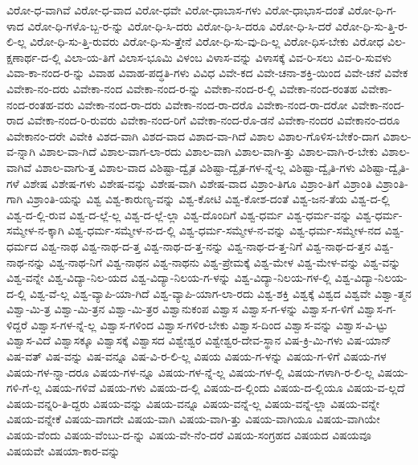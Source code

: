 {ವಿರೋ-ಧ-ವಾಗಿವೆ
ವಿರೋ-ಧ-ವಾದ
ವಿರೋ-ಧವೇ
ವಿರೋ-ಧಾಬಾಸ-ಗಳು
ವಿರೋ-ಧಾಭಾಸ-ದಂತೆ
ವಿರೋ-ಧಿ-ಗ-ಳಾದ
ವಿರೋ-ಧಿ-ಗಳೊ-ಬ್ಬ-ರ-ನ್ನು
ವಿರೋ-ಧಿ-ಸಿ-ದರು
ವಿರೋ-ಧಿ-ಸಿ-ದರೂ
ವಿರೋ-ಧಿ-ಸಿ-ದರೆ
ವಿರೋ-ಧಿ-ಸು-ತ್ತಿ-ರ-ಲಿ-ಲ್ಲ
ವಿರೋ-ಧಿ-ಸು-ತ್ತಿ-ರುವರು
ವಿರೋ-ಧಿ-ಸು-ತ್ತೇನೆ
ವಿರೋ-ಧಿ-ಸು-ವು-ದಿ-ಲ್ಲ
ವಿರೋ-ಧಿಸ-ಬೇಕು
ವಿರೋಧ
ವಿಲ-ಕ್ಷಣಾರ್ಥ-ದ-ಲ್ಲಿ
ವಿಲಾ-ಯ-ತಿಗೆ
ವಿಲಾಸ-ಭೂಮಿ
ವಿಳಂಬ
ವಿಳಾಸ-ವನ್ನು
ವಿಳಾಸಕ್ಕೆ
ವಿವ-ರಿ-ಸಲು
ವಿವ-ರಿ-ಸುವಳು
ವಿವಾ-ಕಾ-ನಂದ-ರ-ನ್ನು
ವಿವಾಹ
ವಿವಾಹ-ಪದ್ಧತಿ-ಗಳು
ವಿವಿಧ
ವಿವೇ-ಕದ
ವಿವೇ-ಚನಾ-ಶಕ್ತಿ-ಯಿಂದ
ವಿವೇ-ಚನೆ
ವಿವೇಕ
ವಿವೇಕಾ-ನಂ-ದರು
ವಿವೇಕಾ-ನಂದ
ವಿವೇಕಾ-ನಂದ-ರ-ನ್ನು
ವಿವೇಕಾ-ನಂದ-ರ-ಲ್ಲಿ
ವಿವೇಕಾ-ನಂದ-ರಂತಹ
ವಿವೇಕಾ-ನಂದ-ರಂತಹ-ವರು
ವಿವೇಕಾ-ನಂದ-ರಾ-ದರು
ವಿವೇಕಾ-ನಂದ-ರಾ-ದರೊ
ವಿವೇಕಾ-ನಂದ-ರಾ-ದರೋ
ವಿವೇಕಾ-ನಂದ-ರಾದ
ವಿವೇಕಾ-ನಂದ-ರಿ-ರುವರು
ವಿವೇಕಾ-ನಂದ-ರಿಗೆ
ವಿವೇಕಾ-ನಂದ-ರೊ-ಡನೆ
ವಿವೇಕಾ-ನಂದರ
ವಿವೇಕಾನಂ-ದರೂ
ವಿವೇಕಾನಂ-ದರೇ
ವಿವೇಕಿ
ವಿಶದ-ವಾಗಿ
ವಿಶದ-ವಾದ
ವಿಶಾದ-ವಾ-ಗಿದೆ
ವಿಶಾಲ
ವಿಶಾಲ-ಗೊಳಿಸ-ಬೇಕೆಂ-ದಾಗ
ವಿಶಾಲ-ವ-ನ್ನಾಗಿ
ವಿಶಾಲ-ವಾ-ಗಿದೆ
ವಿಶಾಲ-ವಾಗ-ಲಾ-ರದು
ವಿಶಾಲ-ವಾಗಿ
ವಿಶಾಲ-ವಾಗಿ-ತ್ತು
ವಿಶಾಲ-ವಾಗಿ-ರ-ಬೇಕು
ವಿಶಾಲ-ವಾಗಿವೆ
ವಿಶಾಲ-ವಾಗು-ತ್ತ
ವಿಶಾಲ-ವಾದ
ವಿಶಿಷ್ಟಾ-ದ್ವೈತ
ವಿಶಿಷ್ಟಾ-ದ್ವೈತ-ಗಳ-ನ್ನೆ-ಲ್ಲ
ವಿಶಿಷ್ಟಾ-ದ್ವೈತಿ-ಗಳು
ವಿಶಿಷ್ಟಾ-ದ್ವೈತಿ-ಗಳೆ
ವಿಶೇಷ
ವಿಶೇಷ-ಗಳು
ವಿಶೇಷ-ವನ್ನು
ವಿಶೇಷ-ವಾಗಿ
ವಿಶೇಷ-ವಾದ
ವಿಶ್ರಾಂ-ತಿಗೂ
ವಿಶ್ರಾಂ-ತಿಗೆ
ವಿಶ್ರಾಂತಿ
ವಿಶ್ರಾಂತಿ-ಗಾಗಿ
ವಿಶ್ರಾಂತಿ-ಯನ್ನು
ವಿಶ್ವ
ವಿಶ್ವ-ಕಾರುಣ್ಯ-ವನ್ನು
ವಿಶ್ವ-ಕೋಟಿ
ವಿಶ್ವ-ಕೋಶ-ದಂತೆ
ವಿಶ್ವ-ಜನ-ತೆಯ
ವಿಶ್ವ-ದ-ಲ್ಲಿ
ವಿಶ್ವ-ದ-ಲ್ಲಿ-ರುವ
ವಿಶ್ವ-ದ-ಲ್ಲೆ-ಲ್ಲ
ವಿಶ್ವ-ದ-ಲ್ಲೆ-ಲ್ಲಾ
ವಿಶ್ವ-ದೊಂದಿಗೆ
ವಿಶ್ವ-ಧರ್ಮ
ವಿಶ್ವ-ಧರ್ಮ-ವನ್ನು
ವಿಶ್ವ-ಧರ್ಮ-ಸಮ್ಮೇಳ-ನ-ಕ್ಕಾಗಿ
ವಿಶ್ವ-ಧರ್ಮ-ಸಮ್ಮೇಳ-ನ-ದ-ಲ್ಲಿ
ವಿಶ್ವ-ಧರ್ಮ-ಸಮ್ಮೇಳ-ನ-ವನ್ನು
ವಿಶ್ವ-ಧರ್ಮ-ಸಮ್ಮೇಳ-ನದ
ವಿಶ್ವ-ಧರ್ಮದ
ವಿಶ್ವ-ನಾಥ
ವಿಶ್ವ-ನಾಥ-ದ-ತ್ತ
ವಿಶ್ವ-ನಾಥ-ದ-ತ್ತ-ನನ್ನು
ವಿಶ್ವ-ನಾಥ-ದ-ತ್ತ-ನಿಗೆ
ವಿಶ್ವ-ನಾಥ-ದ-ತ್ತನ
ವಿಶ್ವ-ನಾಥ-ನನ್ನು
ವಿಶ್ವ-ನಾಥ-ನಿಗೆ
ವಿಶ್ವ-ನಾಥನ
ವಿಶ್ವ-ನಾಥನು
ವಿಶ್ವ-ಪ್ರೇಮಕ್ಕೆ
ವಿಶ್ವ-ಮೇಳ
ವಿಶ್ವ-ಮೇಳ-ವನ್ನು
ವಿಶ್ವ-ವನ್ನು
ವಿಶ್ವ-ವನ್ನೇ
ವಿಶ್ವ-ವಿದ್ಯಾ-ನಿಲ-ಯದ
ವಿಶ್ವ-ವಿದ್ಯಾ-ನಿಲಯ-ಗ-ಳನ್ನು
ವಿಶ್ವ-ವಿದ್ಯಾ-ನಿಲಯ-ಗಳ-ಲ್ಲಿ
ವಿಶ್ವ-ವಿದ್ಯಾ-ನಿಲಯ-ದ-ಲ್ಲಿ
ವಿಶ್ವ-ವೆ-ಲ್ಲ
ವಿಶ್ವ-ವ್ಯಾಪಿ-ಯಾ-ಗಿದೆ
ವಿಶ್ವ-ವ್ಯಾಪಿ-ಯಾಗ-ಲಾ-ರದು
ವಿಶ್ವ-ಶಕ್ತಿ
ವಿಶ್ವಕ್ಕೆ
ವಿಶ್ವದ
ವಿಶ್ವವೇ
ವಿಶ್ವಾ-ತ್ಮನ
ವಿಶ್ವಾ-ಮಿ-ತ್ರ
ವಿಶ್ವಾ-ಮಿ-ತ್ರನ
ವಿಶ್ವಾ-ಮಿ-ತ್ರರ
ವಿಶ್ವಾನುಕಂಪ
ವಿಶ್ವಾಸ
ವಿಶ್ವಾಸ-ಗ-ಳನ್ನು
ವಿಶ್ವಾಸ-ಗ-ಳಿಗೆ
ವಿಶ್ವಾಸ-ಗ-ಳಿದ್ದರೆ
ವಿಶ್ವಾಸ-ಗಳ-ನ್ನೆ-ಲ್ಲ
ವಿಶ್ವಾಸ-ಗಳಿಂದ
ವಿಶ್ವಾಸ-ಗಳಿರ-ಬೇಕು
ವಿಶ್ವಾಸ-ದಿಂದ
ವಿಶ್ವಾಸ-ವನ್ನು
ವಿಶ್ವಾಸ-ವಿ-ಟ್ಟು
ವಿಶ್ವಾಸ-ವಿದೆ
ವಿಶ್ವಾಸಕ್ಕೂ
ವಿಶ್ವಾಸಕ್ಕೆ
ವಿಶ್ವಾಸದ
ವಿಶ್ವೇಶ್ವರ
ವಿಶ್ವೇಶ್ವರ-ದೇವ-ಸ್ಥಾನ
ವಿಷ-ಕ್ರಿ-ಮಿ-ಗಳು
ವಿಷ-ಯಾನ್
ವಿಷ-ವತ್
ವಿಷ-ವನ್ನು
ವಿಷ-ವನ್ನೂ
ವಿಷ-ವಿ-ರ-ಲಿ-ಲ್ಲ
ವಿಷಯ
ವಿಷಯ-ಗ-ಳನ್ನು
ವಿಷಯ-ಗ-ಳಿಗೆ
ವಿಷಯ-ಗಳ
ವಿಷಯ-ಗಳ-ನ್ನಾ-ದರೂ
ವಿಷಯ-ಗಳ-ನ್ನೂ
ವಿಷಯ-ಗಳ-ನ್ನೆ-ಲ್ಲ
ವಿಷಯ-ಗಳ-ಲ್ಲಿ
ವಿಷಯ-ಗಳಾಗಿ-ರ-ಲಿ-ಲ್ಲ
ವಿಷಯ-ಗಳಿ-ಗೆ-ಲ್ಲ
ವಿಷಯ-ಗಳಿವೆ
ವಿಷಯ-ಗಳು
ವಿಷಯ-ದ-ಲ್ಲಿ
ವಿಷಯ-ದ-ಲ್ಲಿಂದು
ವಿಷಯ-ದ-ಲ್ಲಿಯೂ
ವಿಷಯ-ವ-ಲ್ಲದೆ
ವಿಷಯ-ವನ್ನರಿ-ತಿ-ದ್ದರು
ವಿಷಯ-ವನ್ನು
ವಿಷಯ-ವನ್ನೂ
ವಿಷಯ-ವನ್ನೆ-ಲ್ಲ
ವಿಷಯ-ವನ್ನೆ-ಲ್ಲಾ
ವಿಷಯ-ವನ್ನೇ
ವಿಷಯ-ವನ್ನೇಕೆ
ವಿಷಯ-ವಾಗದೇ
ವಿಷಯ-ವಾಗಿ
ವಿಷಯ-ವಾಗಿ-ತ್ತು
ವಿಷಯ-ವಾಗಿಯೂ
ವಿಷಯ-ವಾಗಿಯೇ
ವಿಷಯ-ವೆಂದು
ವಿಷಯ-ವೆಂಬು-ದ-ನ್ನು
ವಿಷಯ-ವೇ-ನೆಂ-ದರೆ
ವಿಷಯ-ಸಂಗ್ರಹದ
ವಿಷಯದ
ವಿಷಯವೂ
ವಿಷಯವೇ
ವಿಷಯಾ-ಕಾರ-ವನ್ನು
}
